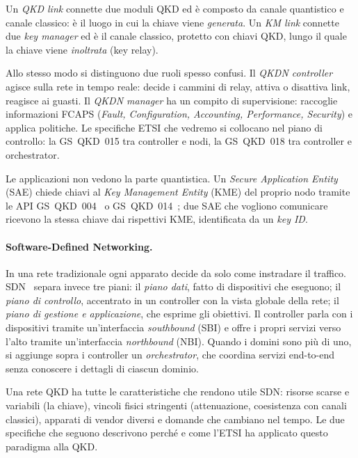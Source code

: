 \begin{definition}
Un \emph{QKD link} connette due moduli QKD ed è composto da canale
quantistico e canale classico: è il luogo in cui la chiave viene
\emph{generata}. Un \emph{KM link} connette due \emph{key manager} ed è il
canale classico, protetto con chiavi QKD, lungo il quale la chiave viene
\emph{inoltrata} (key relay).
\end{definition}

Allo stesso modo si distinguono due ruoli spesso confusi. Il \emph{QKDN
controller} agisce sulla rete in tempo reale: decide i cammini di relay,
attiva o disattiva link, reagisce ai guasti. Il \emph{QKDN manager} ha un
compito di supervisione: raccoglie informazioni FCAPS (\emph{Fault,
Configuration, Accounting, Performance, Security}) e applica politiche. Le
specifiche ETSI che vedremo si collocano nel piano di controllo: la
GS~QKD~015 tra controller e nodi, la GS~QKD~018 tra controller e
orchestrator.



Le applicazioni non vedono la parte quantistica. Un \emph{Secure
Application Entity} (SAE) chiede chiavi al \emph{Key Management Entity}
(KME) del proprio nodo tramite le API GS~QKD~004~\cite{qkd004} o
GS~QKD~014~\cite{qkd014}; due SAE che vogliono comunicare ricevono la
stessa chiave dai rispettivi KME, identificata da un \emph{key ID}.

\paragraph{Software-Defined Networking.}
In una rete tradizionale ogni apparato decide da solo come instradare il
traffico. SDN~\cite{kreutz2015} separa invece tre piani: il \emph{piano
dati}, fatto di dispositivi che eseguono; il \emph{piano di controllo},
accentrato in un controller con la vista globale della rete; il
\emph{piano di gestione e applicazione}, che esprime gli obiettivi. Il
controller parla con i dispositivi tramite un'interfaccia
\emph{southbound} (SBI) e offre i propri servizi verso l'alto tramite
un'interfaccia \emph{northbound} (NBI). Quando i domini sono più di uno, si
aggiunge sopra i controller un \emph{orchestrator}, che coordina servizi
end-to-end senza conoscere i dettagli di ciascun dominio.

Una rete QKD ha tutte le caratteristiche che rendono utile SDN: risorse
scarse e variabili (la chiave), vincoli fisici stringenti (attenuazione,
coesistenza con canali classici), apparati di vendor diversi e domande che
cambiano nel tempo. Le due specifiche che seguono descrivono perché e come
l'ETSI ha applicato questo paradigma alla QKD.
